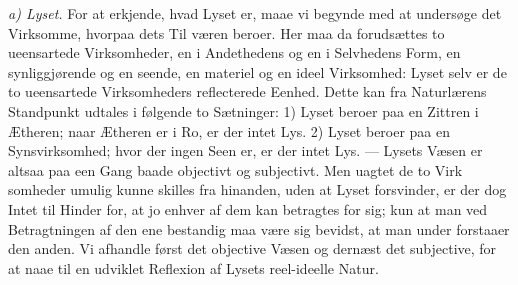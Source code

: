 \documentclass[12pt,a4paper]{book}
\newcommand{\runin}[1]{\emph{#1}\hspace{0.4em}}
\begin{document}
\runin{a) Lyset.} For at erkjende, hvad Lyset er, maae vi begynde med
at undersøge det Virksomme, hvorpaa dets Til\-%
væren beroer. Her maa da forudsættes to ueensartede Virksomheder, en i
Andethedens og en i Selvhedens Form, en synliggjørende og en seende, en
materiel og en ideel Virksomhed: Lyset selv er de to ueensartede
Virksomheders reflecterede Eenhed. Dette kan fra Naturlærens Standpunkt
udtales i følgende to Sætninger: 1) Lyset beroer paa en Zittren i
Ætheren; naar Ætheren er i Ro, er der intet Lys. 2) Lyset beroer paa en
Synsvirksomhed; hvor der ingen Seen er, er der intet Lys. --- Lysets
Væsen er altsaa paa een Gang baade objectivt og subjectivt. Men uagtet
de to Virk\-%
somheder umulig kunne skilles fra hinanden, uden at Lyset forsvinder,
er der dog Intet til Hinder for, at jo enhver af dem kan betragtes for
sig; kun at man ved Betragtningen af den ene bestandig maa være sig
bevidst, at man under\-%
forstaaer den anden. Vi afhandle først det objective Væsen og dernæst
det subjective, for at naae til en udviklet Reflexion af Lysets
reel-ideelle Natur.
\end{document}
